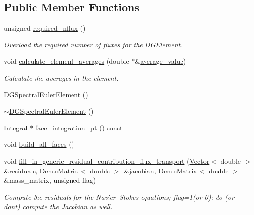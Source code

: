 \subsection*{Public Member Functions}
\begin{DoxyCompactItemize}
\item 
unsigned \hyperlink{classoomph_1_1DGSpectralEulerElement_3_012_00_01NNODE__1D_01_4_a070767446172be36e3abd6faa624d71d}{required\+\_\+nflux} ()
\begin{DoxyCompactList}\small\item\em Overload the required number of fluxes for the \hyperlink{classoomph_1_1DGElement}{D\+G\+Element}. \end{DoxyCompactList}\item 
void \hyperlink{classoomph_1_1DGSpectralEulerElement_3_012_00_01NNODE__1D_01_4_a4eba89afa9c9a037b77f9ed4ccbc766b}{calculate\+\_\+element\+\_\+averages} (double $\ast$\&\hyperlink{classoomph_1_1DGElement_a9349e3c349f9cf3b25bcb6121e86a7f2}{average\+\_\+value})
\begin{DoxyCompactList}\small\item\em Calculate the averages in the element. \end{DoxyCompactList}\item 
\hyperlink{classoomph_1_1DGSpectralEulerElement_3_012_00_01NNODE__1D_01_4_a2c43729d163fb8f43d78c546b4c2cc0a}{D\+G\+Spectral\+Euler\+Element} ()
\item 
\hyperlink{classoomph_1_1DGSpectralEulerElement_3_012_00_01NNODE__1D_01_4_a6d74232028a84f5cd43bc13fc280f325}{$\sim$\+D\+G\+Spectral\+Euler\+Element} ()
\item 
\hyperlink{classoomph_1_1Integral}{Integral} $\ast$ \hyperlink{classoomph_1_1DGSpectralEulerElement_3_012_00_01NNODE__1D_01_4_abcd6b0ac3212b7079b02f01774a533b0}{face\+\_\+integration\+\_\+pt} () const
\item 
void \hyperlink{classoomph_1_1DGSpectralEulerElement_3_012_00_01NNODE__1D_01_4_ae9cdecdb217f91b99b24f960a1ab85ab}{build\+\_\+all\+\_\+faces} ()
\item 
void \hyperlink{classoomph_1_1DGSpectralEulerElement_3_012_00_01NNODE__1D_01_4_a91aa95f61d0d91d89f3d899fbb4fdad3}{fill\+\_\+in\+\_\+generic\+\_\+residual\+\_\+contribution\+\_\+flux\+\_\+transport} (\hyperlink{classoomph_1_1Vector}{Vector}$<$ double $>$ \&residuals, \hyperlink{classoomph_1_1DenseMatrix}{Dense\+Matrix}$<$ double $>$ \&jacobian, \hyperlink{classoomph_1_1DenseMatrix}{Dense\+Matrix}$<$ double $>$ \&mass\+\_\+matrix, unsigned flag)
\begin{DoxyCompactList}\small\item\em Compute the residuals for the Navier--Stokes equations; flag=1(or 0)\+: do (or don\textquotesingle{}t) compute the Jacobian as well. \end{DoxyCompactList}\end{DoxyCompactItemize}
